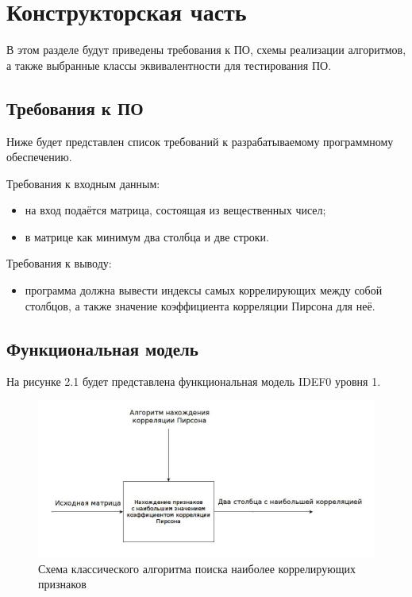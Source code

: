 \chapter{Конструкторская часть}
В этом разделе будут приведены требования к ПО, схемы реализации алгоритмов,
а также выбранные классы эквивалентности для тестирования ПО.

\section{Требования к ПО}
Ниже будет представлен список требований к разрабатываемому программному обеспечению. 

Требования к входным данным: 
\begin{itemize}
	\item на вход подаётся матрица, состоящая из вещественных чисел;
	\item в матрице как минимум два столбца и две строки.
\end{itemize}

Требования к выводу: 
\begin{itemize}
	\item программа должна вывести индексы самых коррелирующих между собой столбцов, а также значение коэффициента корреляции Пирсона для неё.
\end{itemize}

\section{Функциональная модель}
На рисунке 2.1 будет представлена функциональная модель IDEF0 уровня 1.
\FloatBarrier
\begin{figure}[hp]
	\begin{center}
		\includegraphics[width=\linewidth]{inc/func.jpg}
	\end{center}
	\caption{Схема классического алгоритма поиска наиболее коррелирующих признаков}
\end{figure}
\FloatBarrier

